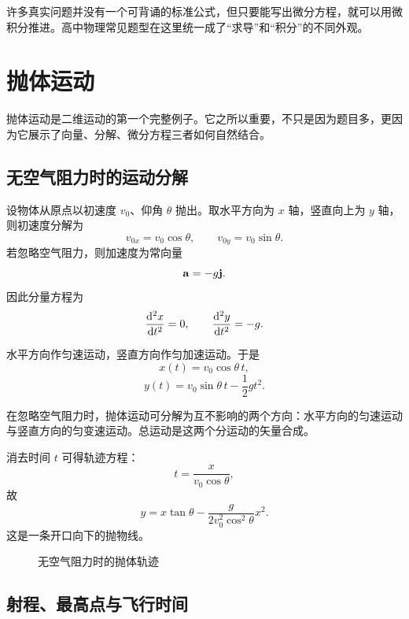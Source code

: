 \begin{remark}
许多真实问题并没有一个可背诵的标准公式，但只要能写出微分方程，就可以用微积分推进。高中物理常见题型在这里统一成了``求导''和``积分''的不同外观。
\end{remark}

\section{抛体运动}

抛体运动是二维运动的第一个完整例子。它之所以重要，不只是因为题目多，更因为它展示了向量、分解、微分方程三者如何自然结合。

\subsection{无空气阻力时的运动分解}

设物体从原点以初速度 $v_0$、仰角 $\theta$ 抛出。取水平方向为 $x$ 轴，竖直向上为 $y$ 轴，则初速度分解为
\[
 v_{0x}=v_0\cos\theta,\qquad v_{0y}=v_0\sin\theta.
\]
若忽略空气阻力，则加速度为常向量
\[
\vb{a}=-g\vb{j}.
\]
因此分量方程为
\[
\dv[2]{x}{t}=0,\qquad \dv[2]{y}{t}=-g.
\]

水平方向作匀速运动，竖直方向作匀加速运动。于是
\[
 x(t)=v_0\cos\theta\, t,
\]
\[
 y(t)=v_0\sin\theta\, t-\frac12 gt^2.
\]

\begin{law}[平抛与斜抛的分运动独立性]
在忽略空气阻力时，抛体运动可分解为互不影响的两个方向：水平方向的匀速运动与竖直方向的匀变速运动。总运动是这两个分运动的矢量合成。
\end{law}

消去时间 $t$ 可得轨迹方程：
\[
 t=\frac{x}{v_0\cos\theta},
\]
故
\[
 y=x\tan\theta-\frac{g}{2v_0^2\cos^2\theta}x^2.
\]
这是一条开口向下的抛物线。

\begin{figure}[H]
\centering
{}
\caption{无空气阻力时的抛体轨迹}
\end{figure}

\subsection{射程、最高点与飞行时间}

